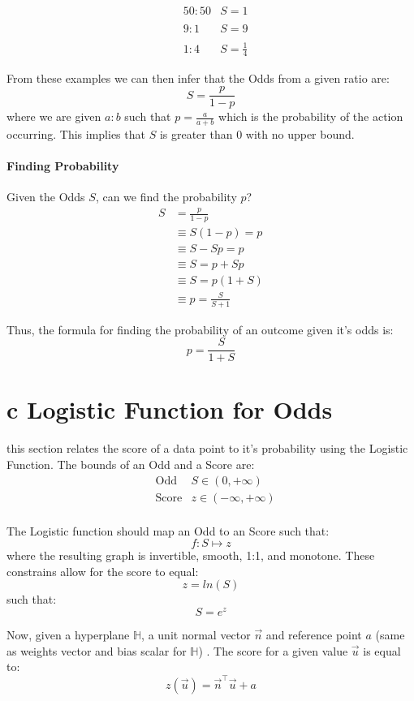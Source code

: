 \documentclass[12pt]{book}
\begin{document}
\begin{align*}
       &50:50 &S=1\\
       \\
       &9:1 &S=9\\
       \\
       &1:4 &S=\frac{1}{4}
\end{align*}
\pagebreak

From these examples we can then infer that the Odds from a given ratio are: 
\[S = \frac{p}{1-p}\] 
where we are given $a:b$ such that $p = \frac{a}{a+b}$ which is the probability
of the action occurring.
This implies that $S$ is greater than 0 with no upper bound.

\paragraph{Finding Probability}
Given the Odds $S$, can we find the probability $p$?
\begin{align*}
        S &= \frac{p}{1-p}\\
        &\equiv S(1-p) = p\\
        &\equiv S-Sp = p\\
        &\equiv S = p+Sp\\
        &\equiv S = p(1+S)\\
        &\equiv p = \frac{S}{S+1}
\end{align*}

Thus, the formula for finding the probability of an outcome  given it's odds is:
\[p = \frac{S}{1+S}\]

\section*{c Logistic Function for Odds}
this section relates the score of a data point to it's probability using 
the Logistic Function. The bounds of an Odd and a Score are:
\begin{align*}
        &\text{Odd} &S \in (0, +\infty)\\
        &\text{Score} &z \in (-\infty, +\infty)\\
\end{align*}

The Logistic function should map an Odd to an Score such that:
\[f:S\mapsto z\]
where the resulting graph is invertible, smooth, 1:1, and monotone.
These constrains allow for the score to equal:
\[z = ln(S)\]
such that:
\[S = e^z\]

Now, given a hyperplane $\mathbb{H}$, a unit normal vector $\vec n$ and
reference point $a$ (same as weights vector and bias scalar for $\mathbb{H}$)
. The score for a given value $\vec u$ is equal to:
\[z(\vec u) = \vec n^\top \vec u + a\]
\end{document}
